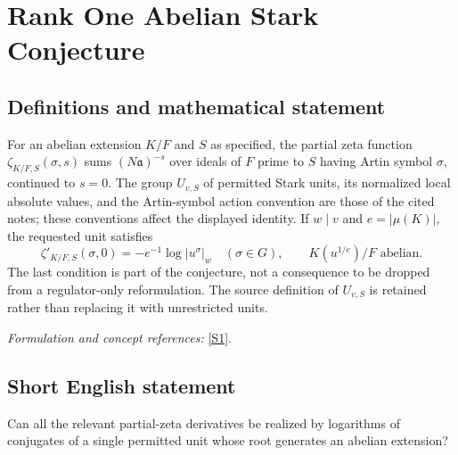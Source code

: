 \documentclass[11pt,a4paper]{article}
\newcommand{\sref}[2]{\hyperlink{source:#1:#2}{[S#2]}}
\newif\ifshowcatalogue
\newcommand{\cataloguescope}[1]{\ifshowcatalogue
 \paragraph{Exact scope in the supplied catalogue.}
 \begin{quote}\small #1\end{quote}\fi}
\numberwithin{equation}{section}
\begin{document}
\setcounter{section}{197}
\clearpage
\section{\texorpdfstring{Rank One Abelian Stark Conjecture}{Rank One Abelian Stark Conjecture}}\label{198}
\subsection{Definitions and mathematical statement}
For an abelian extension $K/F$ and $S$ as specified, the partial zeta function $\zeta_{K/F,S}(\sigma,s)$ sums $(N\mathfrak a)^{-s}$ over ideals of $F$ prime to $S$ having Artin symbol $\sigma$, continued to $s=0$. The group $U_{v,S}$ of permitted Stark units, its normalized local absolute values, and the Artin-symbol action convention are those of the cited notes; these conventions affect the displayed identity. If $w\mid v$ and $e=|\mu(K)|$, the requested unit satisfies
\[
 \zeta'_{K/F,S}(\sigma,0)=-e^{-1}\log|u^\sigma|_w
 \quad(\sigma\in G),\qquad K(u^{1/e})/F\text{ abelian}.
\]
The last condition is part of the conjecture, not a consequence to be dropped from a regulator-only reformulation. The source definition of $U_{v,S}$ is retained rather than replacing it with unrestricted units.
\par\smallskip\textit{Formulation and concept references:} \sref{198}{1}.
\cataloguescope{Let K/F be an abelian extension of number fields with Galois group G, and let S be a finite set of places of F containing the archimedean and ramified places, with |S| >= 2 and at least one place v of S splitting completely in K. Prove that, for a fixed place w of K above v, there exists a unit u in U\_\{v,S\} such that zeta'\_\{K/F,S\}(sigma, 0) = -(1/e) log |u\textasciicircum{}sigma|\_w for all sigma in G, where e is the number of roots of unity in K, and K(u\textasciicircum{}\{1/e\})/F is abelian.}
\subsection{Short English statement}
Can all the relevant partial-zeta derivatives be realized by logarithms of conjugates of a single permitted unit whose root generates an abelian extension?
\end{document}
